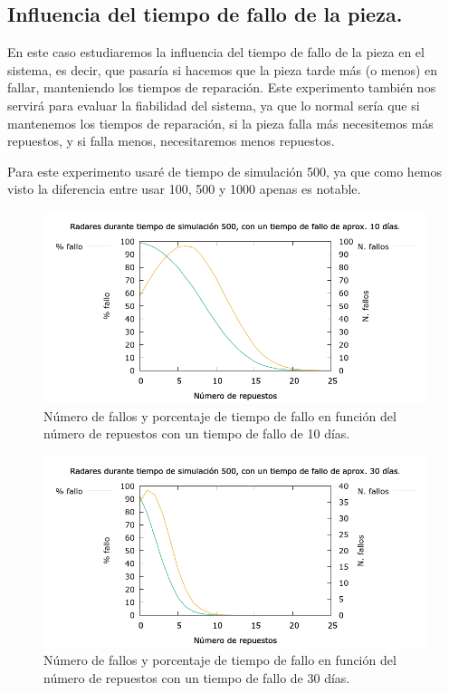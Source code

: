 \documentclass[12pt, spanish]{article}
\begin{document}
\subsection{Influencia del tiempo de fallo de la pieza.}

En este caso estudiaremos la influencia del tiempo de fallo de la pieza en el sistema, es decir, que pasaría si hacemos que la pieza tarde más (o menos) en fallar, manteniendo los tiempos de reparación. Este experimento también nos servirá para evaluar la fiabilidad del sistema, ya que lo normal sería que si mantenemos los tiempos de reparación, si la pieza falla más necesitemos más repuestos, y si falla menos, necesitaremos menos repuestos.

Para este experimento usaré de tiempo de simulación 500, ya que como hemos visto la diferencia entre usar 100, 500 y 1000 apenas es notable.


\begin{figure}[H]
	\centering
	\includegraphics[scale = 0.6]{radares_500_10.png}
	\caption{Número de fallos y porcentaje de tiempo de fallo en función del número de repuestos con un tiempo de fallo de 10 días.}
	\label{fig:ej4}
\end{figure}

\begin{figure}[H]
	\centering
	\includegraphics[scale = 0.6]{radares_500_30.png}
	\caption{Número de fallos y porcentaje de tiempo de fallo en función del número de repuestos con un tiempo de fallo de 30 días.}
	\label{fig:ej4}
\end{figure}
\end{document}

